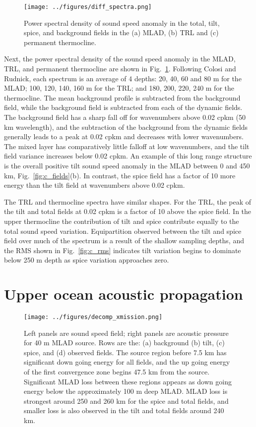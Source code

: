 \documentclass[preprint,NumberedRefs]{JASA}
\begin{document}
\begin{figure}
\texttt{[image: ../figures/diff\_spectra.png]}
        \caption{\label{fig:spectra}{Power spectral density of sound speed anomaly in the total, tilt, spice, and background fields in the (a) MLAD, (b) TRL and (c) permanent thermocline.}}
\end{figure}
Next, the power spectral density of the sound speed anomaly in the MLAD, TRL, and permanent thermocline are shown in Fig.~\ref{fig:spectra}. Following Colosi and Rudnick\cite{colosi2020observations}, each spectrum is an average of 4 depths: 20, 40, 60 and 80 m for the MLAD; 100, 120, 140, 160 m for the TRL; and 180, 200, 220, 240 m for the thermocline. The mean background profile is subtracted from the background field, while the background field is subtracted from each of the dynamic fields. The background field has a sharp fall off for wavenumbers above 0.02 cpkm (50 km wavelength), and the subtraction of the background from the dynamic fields generally leads to a peak at 0.02 cpkm and decreases with lower wavenumbers. The mixed layer has comparatively little falloff at low wavenumbers, and the tilt field variance increases below 0.02 cpkm. An example of this long range structure is the overall positive tilt sound speed anomaly in the MLAD between 0 and 450 km, Fig.~\ref{fig:c_fields}(b). In contrast, the spice field has a factor of 10 more energy than the tilt field at wavenumbers above 0.02 cpkm.

The TRL and thermocline spectra have similar shapes. For the TRL, the peak of the tilt and total fields at 0.02 cpkm is a factor of 10 above the spice field. In the upper thermocline the contribution of tilt and spice contribute equally to the total sound speed variation. Equipartition observed between the tilt and spice field over much of the spectrum is a result of the shallow sampling depths, and the RMS shown in Fig.~\ref{fig:c_rms} indicates tilt variation begins to dominate below 250 m depth as spice variation approaches zero.

\section{\label{sec:propagation}Upper ocean acoustic propagation}
\begin{figure}
\texttt{[image: ../figures/decomp\_xmission.png]}
    \caption{\label{fig:decomp_x}{Left panels are sound speed field; right panels are acoustic pressure for 40 m MLAD source. Rows are the: (a) background (b) tilt, (c) spice, and (d) observed fields. The source region before 7.5 km has significant down going energy for all fields, and the up going energy of the first convergence zone begins 47.5 km from the source. Significant MLAD loss between these regions appears as down going energy below the approximately 100 m deep MLAD. MLAD loss is strongest around 250 and 260 km for the spice and total fields, and smaller loss is also observed in the tilt and total fields around 240 km.}}
\end{figure}
\end{document}
